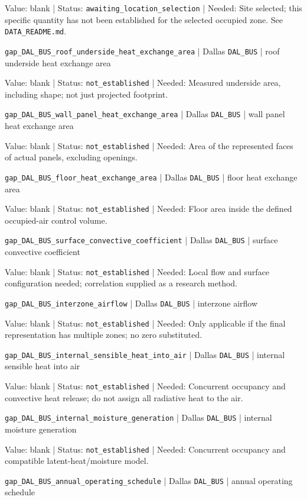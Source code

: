 Value: blank | Status: \nolinkurl{awaiting_location_selection} | Needed: Site selected; this specific quantity has not been established for the selected occupied zone. See \nolinkurl{DATA_README.md}.

\nolinkurl{gap_DAL_BUS_roof_underside_heat_exchange_area} | Dallas \nolinkurl{DAL_BUS}  | roof underside heat exchange area

Value: blank | Status: \nolinkurl{not_established} | Needed: Measured underside area, including shape; not just projected footprint.

\nolinkurl{gap_DAL_BUS_wall_panel_heat_exchange_area} | Dallas \nolinkurl{DAL_BUS}  | wall panel heat exchange area

Value: blank | Status: \nolinkurl{not_established} | Needed: Area of the represented faces of actual panels, excluding openings.

\nolinkurl{gap_DAL_BUS_floor_heat_exchange_area} | Dallas \nolinkurl{DAL_BUS}  | floor heat exchange area

Value: blank | Status: \nolinkurl{not_established} | Needed: Floor area inside the defined occupied-air control volume.

\nolinkurl{gap_DAL_BUS_surface_convective_coefficient} | Dallas \nolinkurl{DAL_BUS}  | surface convective coefficient

Value: blank | Status: \nolinkurl{not_established} | Needed: Local flow and surface configuration needed; correlation supplied as a research method.

\nolinkurl{gap_DAL_BUS_interzone_airflow} | Dallas \nolinkurl{DAL_BUS}  | interzone airflow

Value: blank | Status: \nolinkurl{not_established} | Needed: Only applicable if the final representation has multiple zones; no zero substituted.

\nolinkurl{gap_DAL_BUS_internal_sensible_heat_into_air} | Dallas \nolinkurl{DAL_BUS}  | internal sensible heat into air

Value: blank | Status: \nolinkurl{not_established} | Needed: Concurrent occupancy and convective heat release; do not assign all radiative heat to the air.

\nolinkurl{gap_DAL_BUS_internal_moisture_generation} | Dallas \nolinkurl{DAL_BUS}  | internal moisture generation

Value: blank | Status: \nolinkurl{not_established} | Needed: Concurrent occupancy and compatible latent-heat/moisture model.

\nolinkurl{gap_DAL_BUS_annual_operating_schedule} | Dallas \nolinkurl{DAL_BUS}  | annual operating schedule

